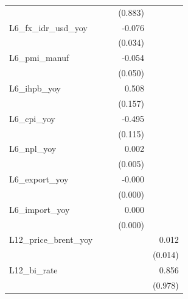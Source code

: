 {\begin{tabular}{l*{4}{D{.}{.}{-1}}}
                &                  &                  &  (0.883)         &                  \\
\addlinespace
L6\_fx\_idr\_usd\_yoy&                  &                  &   -0.076\sym{**} &                  \\
                &                  &                  &  (0.034)         &                  \\
\addlinespace
L6\_pmi\_manuf    &                  &                  &   -0.054         &                  \\
                &                  &                  &  (0.050)         &                  \\
\addlinespace
L6\_ihpb\_yoy     &                  &                  &    0.508\sym{***}&                  \\
                &                  &                  &  (0.157)         &                  \\
\addlinespace
L6\_cpi\_yoy      &                  &                  &   -0.495\sym{***}&                  \\
                &                  &                  &  (0.115)         &                  \\
\addlinespace
L6\_npl\_yoy      &                  &                  &    0.002         &                  \\
                &                  &                  &  (0.005)         &                  \\
\addlinespace
L6\_export\_yoy   &                  &                  &   -0.000         &                  \\
                &                  &                  &  (0.000)         &                  \\
\addlinespace
L6\_import\_yoy   &                  &                  &    0.000         &                  \\
                &                  &                  &  (0.000)         &                  \\
\addlinespace
L12\_price\_brent\_yoy&                  &                  &                  &    0.012         \\
                &                  &                  &                  &  (0.014)         \\
\addlinespace
L12\_bi\_rate     &                  &                  &                  &    0.856         \\
                &                  &                  &                  &  (0.978)         \\

\end{tabular}}

